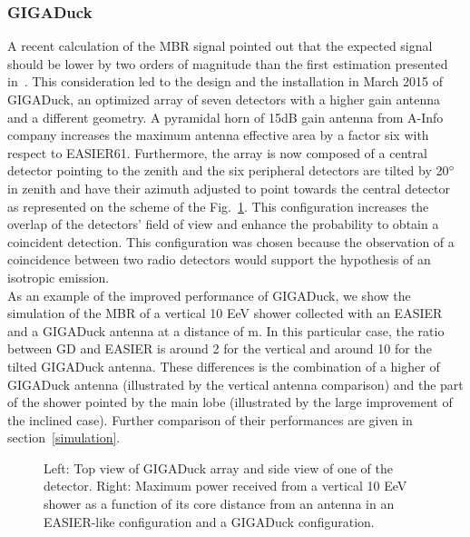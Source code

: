 \subsubsection*{GIGADuck}
A recent calculation  of the MBR signal pointed  out that the expected
signal should  be lower by two orders of  magnitude than the
first estimation presented in~\cite{Gorham}. This consideration led to
the  design  and  the  installation  in March  2015  of  GIGADuck,  an
optimized array  of seven detectors with  a higher gain  antenna and a
different  geometry.   A pyramidal horn of 15dB  gain  antenna from A-Info company increases the  maximum antenna effective area by a factor six with respect to EASIER61.  Furthermore, the array is now composed of a central detector pointing to the zenith and the six peripheral detectors are tilted by 20$\rm ^{\circ} $ in zenith and have their azimuth adjusted to point towards the central detector as represented on the scheme of the Fig.~\ref{fig:GD}.  This configuration  increases the overlap of the detectors' field of view and enhance the probability to obtain a coincident detection. This configuration was chosen because the observation of a coincidence between two radio detectors would support the hypothesis of an isotropic emission.\\
As an example of the improved performance of GIGADuck, we show the simulation of the MBR of a vertical 10 EeV shower collected with  an EASIER and a GIGADuck antenna at a distance of  \unit[750]{m}. In this particular case, the ratio between GD and EASIER is around 2 for the vertical and around 10 for the tilted GIGADuck antenna. These differences is the combination of a higher of GIGADuck antenna (illustrated by the vertical antenna comparison) and the part of the shower pointed by the main lobe (illustrated by the large improvement of the inclined case). Further comparison of their performances are given in section~\ref{simulation}.

\begin{figure}[!ht]
  \centering
  \hspace*{-3ex}  
  \caption{Left: Top  view of GIGADuck array  and side view  of one of
    the detector.   Right: Maximum power  received from a  vertical 10
    EeV shower as  a function of its core distance  from an antenna in
    an EASIER-like configuration and a GIGADuck configuration.}
  \label{fig:GD}  
\end{figure}

